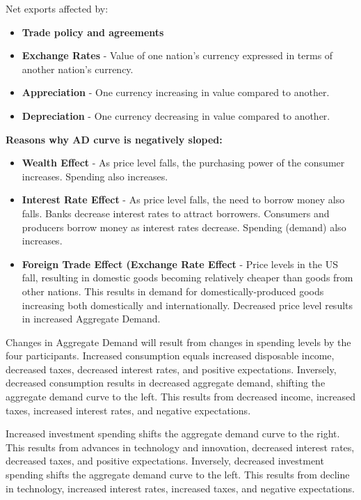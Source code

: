 \documentclass{article}
\begin{document}
\begin{itemize}
{    Net exports affected by:
    \begin{itemize}
        \item{\textbf{Trade policy and agreements}}
        \item{\textbf{Exchange Rates} - Value of one nation's currency expressed in terms of another nation's currency.}
        \item{\textbf{Appreciation} - One currency increasing in value compared to another.}
        \item{\textbf{Depreciation} - One currency decreasing in value compared to another.}
    \end{itemize}}
    \textbf{Reasons why AD curve is negatively sloped:}
    \begin{itemize}
        \item{\textbf{Wealth Effect} - As price level falls, the purchasing power of the consumer increases. Spending also increases.}
        \item{\textbf{Interest Rate Effect} - As price level falls, the need to borrow money also falls. Banks decrease interest rates to attract borrowers. Consumers and producers borrow money as interest rates decrease. Spending (demand) also increases.}
        \item{\textbf{Foreign Trade Effect (Exchange Rate Effect} - Price levels in the US fall, resulting in domestic goods becoming relatively cheaper than goods from other nations. This results in demand for domestically-produced goods increasing both domestically and internationally. Decreased price level results in increased Aggregate Demand.}
    \end{itemize}
\end{itemize}

    Changes in Aggregate Demand will result from changes in spending levels by the four participants. Increased consumption equals increased disposable income, decreased taxes, decreased interest rates, and positive expectations. Inversely, decreased consumption results in decreased aggregate demand, shifting the aggregate demand curve to the left. This results from decreased income, increased taxes, increased interest rates, and negative expectations. 
    
    Increased investment spending shifts the aggregate demand curve to the right. This results from advances in technology and innovation, decreased interest rates, decreased taxes, and positive expectations. Inversely, decreased investment spending shifts the aggregate demand curve to the left. This results from decline in technology, increased interest rates, increased taxes, and negative expectations. 
    
\end{document}
